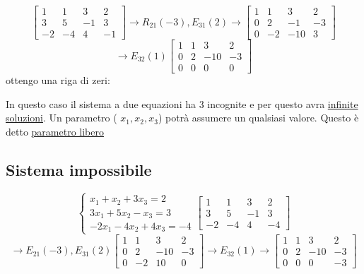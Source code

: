 \[
	\begin{bmatrix}
		1  & 1  & 3  & 2  \\
		3  & 5  & -1 & 3  \\
		-2 & -4 & 4  & -1
	\end{bmatrix}
	\rightarrow R_{21}\left( -3 \right) , E_{31}\left( 2 \right)
	\rightarrow
	\begin{bmatrix}
		1 & 1  & 3   & 2  \\
		0 & 2  & -1  & -3 \\
		0 & -2 & -10 & 3
	\end{bmatrix}
\]
\[
	\rightarrow E_{32}\left( 1 \right)
	\begin{bmatrix}
		1 & 1 & 3   & 2  \\
		0 & 2 & -10 & -3 \\
		0 & 0 & 0   & 0
	\end{bmatrix}
\]
ottengo una riga di zeri:

\begin{center}
\end{center}

In questo caso il sistema a due equazioni ha 3 incognite e per questo avra \underline{infinite soluzioni}. Un parametro ( $x_1, x_2 ,x_3$) potrà assumere un qualsiasi valore. Questo è detto \underline{parametro libero}

\subsection{Sistema impossibile}
\[
	\begin{cases}
		x_1 + x_2 + 3x_3 = 2   \\
		3x_1 + 5 x_2 - x_3 = 3 \\
		-2x_1 - 4 x_2 + 4 x_3 = -4
	\end{cases}
	\begin{bmatrix}
		1  & 1  & 3  & 2  \\
		3  & 5  & -1 & 3  \\
		-2 & -4 & 4  & -4
	\end{bmatrix}
\]
\[
	\rightarrow E_{21}\left( -3 \right) , E_{31} \left( 2 \right)
	\begin{bmatrix}
		1 & 1  & 3   & 2  \\
		0 & 2  & -10 & -3 \\
		0 & -2 & 10  & 0
	\end{bmatrix}
	\rightarrow E_{32}\left( 1 \right)  \rightarrow
	\begin{bmatrix}
		1 & 1 & 3   & 2  \\
		0 & 2 & -10 & -3 \\
		0 & 0 & 0   & -3
	\end{bmatrix}
\]

